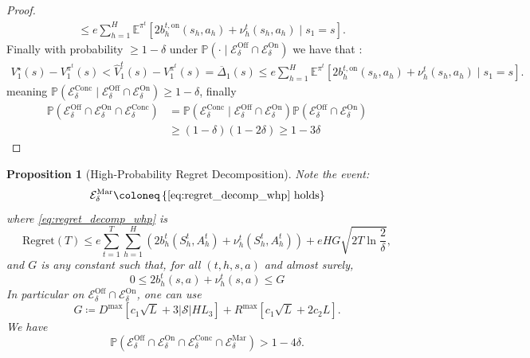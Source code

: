 \documentclass[twoside]{article}
\newtheorem{proposition}{Proposition}
\newcommand{\on}{\mathrm{on}} %
\newcommand{\bont}{b_h^{t,\on}} %
\begin{document}
\begin{proof}
\begin{align*}
    & \le e \sum_{h=1}^H \mathbb{E}^{\pi^t} \left[2\bont(s_h,a_h)+\nu_h^{t}(s_h,a_h)\mid s_{1}=s\right].
\end{align*}
Finally with probability $\geq 1-\delta$ under $\mathbb{P}(\cdot \mid \mathcal{E}^{\mathrm{Off}}_\delta\cap \mathcal{E}^{\mathrm{On}}_\delta)$ we have that :  
\begin{align*}
V^\star_{1}(s)-V^{\pi^t}_{1}(s) < \widehat{V}_{1}^t(s)-V^{\pi^t}_{1}(s) = \overline{\Delta}_{1}(s) \leq e \sum_{h=1}^H \mathbb{E}^{\pi^t} \left[2\bont(s_h,a_h)+\nu_h^{t}(s_h,a_h)\mid s_{1}=s\right].
\end{align*}
meaning $\mathbb{P}(\mathcal{E}^{\mathrm{Conc}}_\delta\mid \mathcal{E}^{\mathrm{Off}}_\delta\cap \mathcal{E}^{\mathrm{On}}_\delta) \geq 1-\delta$, finally 
\begin{align*}
    \mathbb{P}\left (\mathcal{E}^{\mathrm{Off}}_\delta\cap \mathcal{E}^{\mathrm{On}}_\delta \cap \mathcal{E}^{\mathrm{Conc}}_\delta \right ) & = \mathbb{P}\left (\mathcal{E}^{\mathrm{Conc}}_\delta \mid \mathcal{E}^{\mathrm{Off}}_\delta\cap \mathcal{E}^{\mathrm{On}}_\delta  \right ) \mathbb{P}\left (\mathcal{E}^{\mathrm{Off}}_\delta\cap \mathcal{E}^{\mathrm{On}}_\delta  \right ) \\
    & \geq (1-\delta)(1-2\delta) \geq 1 - 3\delta
\end{align*}

\end{proof}

\begin{proposition}[High-Probability Regret Decomposition]\label{prop:regret_decomp_whp}
Note the event:
\[
\mathcal{E}^{\mathrm{Mar}}_\delta \coloneq \left \lbrace \eqref{eq:regret_decomp_whp} ~ \mathrm{holds} \right \rbrace 
\]
where \eqref{eq:regret_decomp_whp} is
\begin{equation}\label{eq:regret_decomp_whp}
\mathrm{Regret}(T) 
\le
e \sum_{t=1}^{T}\sum_{h=1}^{H}\left(2b_h^{t}(S_h^t,A_h^t)+ \nu_h^{t}(S_h^t,A_h^t)\right)
+
eHG\sqrt{2T\ln \dfrac{2}{\delta}},
\end{equation}
and $G$ is any constant such that, for all $(t,h,s,a)$ and almost surely,
%
\begin{equation}\label{eq:def_G}
0 \le 2b_h^{t}(s,a)+ \nu_h^{t}(s,a)
\le
G
\end{equation}
In particular on $\mathcal{E}^{\mathrm{Off}}_\delta\cap\mathcal{E}^{\mathrm{On}}_\delta$, one can use
\begin{equation}
\label{eq:G_def}
G \coloneqq D^{\max}\left[c_1\sqrt{L}+3|\mathcal{S}|HL_3\right]
+R^{\max}\left[c_1\sqrt{L}+2c_2L\right].
\end{equation}
We have 
\[
\mathbb{P} \left ( \mathcal{E}^{\mathrm{Off}}_\delta\cap \mathcal{E}^{\mathrm{On}}_\delta \cap \mathcal{E}^{\mathrm{Conc}}_\delta \cap \mathcal{E}^{\mathrm{Mar}}_\delta  \right ) > 1 - 4\delta.
\]
\end{proposition}
\end{document}
